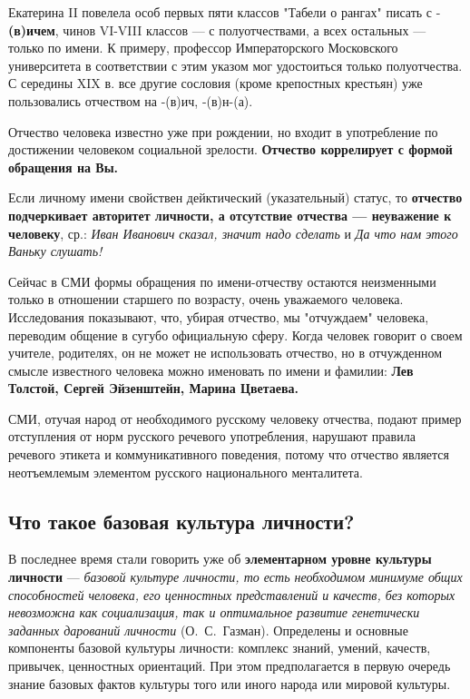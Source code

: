 Екатерина II повелела особ первых пяти классов "Табели о рангах" писать с - \textbf{(в)ичем}, чинов VI-VIII классов --- с полуотчествами, а всех остальных --- только по имени.
К примеру, профессор Императорского Московского университета в соответствии с этим указом мог удостоиться только полуотчества.
С середины XIX в. все другие сословия (кроме крепостных крестьян) уже пользовались отчеством на -(в)ич, -(в)н-(а).

Отчество человека известно уже при рождении, но входит в употребление по достижении человеком социальной зрелости.
\textbf{Отчество коррелирует с формой обращения на Вы.}

Если личному имени свойствен дейктический (указательный) статус, то \textbf{отчество подчеркивает авторитет личности, а отсутствие отчества --- неуважение к человеку}, ср.: \textit{Иван Иванович сказал, значит надо сделать} и \textit{Да что нам этого Ваньку слушать!}

Сейчас в СМИ формы обращения по имени-отчеству остаются неизменными только в отношении старшего по возрасту, очень уважаемого человека.
Исследования показывают, что, убирая отчество, мы "отчуждаем" человека, переводим общение в сугубо официальную сферу.
Когда человек говорит о своем учителе, родителях, он не может не использовать отчество, но в отчужденном смысле известного человека можно именовать по имени и фамилии: \textbf{ Лев Толстой, Сергей Эйзенштейн, Марина Цветаева.}

СМИ, отучая народ от необходимого русскому человеку отчества, подают { пример отступления от норм русского речевого употребления, нарушают правила речевого этикета и коммуникативного поведения}, потому что отчество является неотъемлемым элементом русского национального менталитета.

\subsection*{Что такое базовая культура личности?}

В последнее время стали говорить уже об \textbf{элементарном уровне культуры личности} --- \textit{базовой культуре личности, то есть необходимом минимуме общих способностей человека, его ценностных представлений и качеств, без которых невозможна как социализация, так и оптимальное развитие генетически заданных дарований личности} (О.~С.~Газман).
Определены и основные компоненты базовой культуры личности: комплекс знаний, умений, качеств, привычек, ценностных ориентаций.
При этом предполагается в первую очередь знание базовых фактов культуры того или иного народа или мировой культуры.

